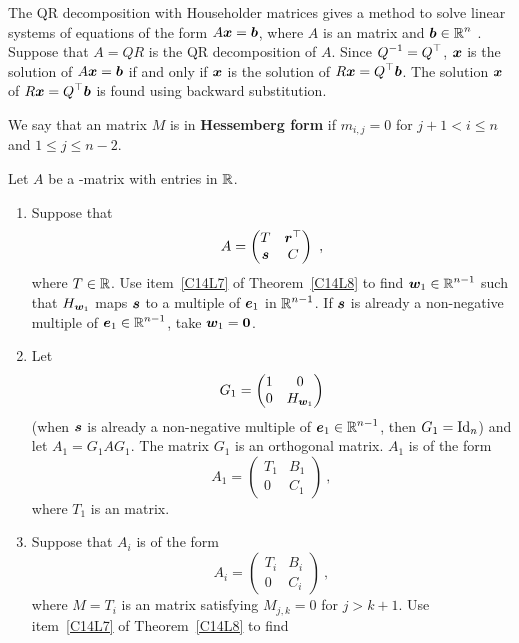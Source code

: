 The QR decomposition with Householder matrices gives a method to solve linear
systems of equations of the form $A\bm{x} = \bm{b}$, where $A$ is an 
 matrix and $\displaystyle \bm{b}\in \mathbb{R}^n$ .  Suppose that
$A=Q R$ is the QR decomposition of $A$.  Since
$\displaystyle Q^{-1}=Q^\top$, $\bm{x}$
is the solution of $A\bm{x} = \bm{b}$ if and only if $\bm{x}$ is the
solution of $\displaystyle R\bm{x} = Q^\top \bm{b}$.  The solution
$\bm{x}$ of $\displaystyle R\bm{x} = Q^\top \bm{b}$ is found using
backward substitution.

\begin{defn}
We say that an \nn matrix $M$ is in
{\bfseries Hessemberg form} if
$m_{i,j} = 0$ for $j + 1 < i \leq n$ and $1\leq j \leq n-2$.
\end{defn}

\begin{algo}
Let $A$ be a \nn-matrix with entries in $\mathbb{R}$.
\begin{enumerate}
\item  Suppose that
\[
A = \begin{pmatrix}
T & \bm{r}^\top \\
\bm{s} & C
\end{pmatrix} \ ,
\]
where $T \in \mathbb{R}$.  Use item~\ref{C14L7} of Theorem~\ref{C14L8} to
find $\displaystyle \bm{w}_1 \in \mathbb{R}^{n-1}$ such that $H_{\bm{w}_1}$
maps $\bm{s}$ to a multiple of $\bm{e}_1$ in
$\displaystyle \mathbb{R}^{n-1}$.  If $\bm{s}$ is already a
non-negative multiple of $\displaystyle \bm{e}_1 \in \mathbb{R}^{n-1}$, take
$\bm{w}_1=\bm{0}$.
\item  Let
\[
G_1 = \begin{pmatrix}
1 & 0 \\
0 & H_{\bm{w}_1}
\end{pmatrix}
\]
(when $\bm{s}$ is already a non-negative multiple of
$\displaystyle \bm{e}_1 \in \mathbb{R}^{n-1}$, then $G_1 = \operatorname{Id}_n$) and let
$A_1 = G_1 A G_1$.  The matrix $G_1$ is an orthogonal matrix.  $A_1$
is of the form
\[
A_1 = \begin{pmatrix}
T_1 & B_1 \\
0 & C_1
\end{pmatrix} \ ,
\]
where $T_1$ is an  matrix.
\item Suppose that $A_i$ is of the form
\[
A_i =
\begin{pmatrix}
T_i & B_i \\
0 & C_i
\end{pmatrix} \ ,
\]
where $M=T_i$ is an  matrix satisfying $M_{j,k} = 0$
for $j > k+1$.  Use item~\ref{C14L7} of Theorem~\ref{C14L8} to find

\end{enumerate}
\end{algo}

